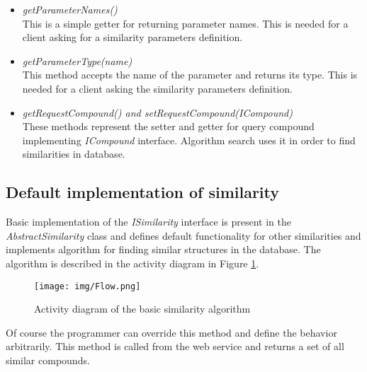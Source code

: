 \documentclass[thesis=M,english]{FITthesis}[2012/10/20]
\begin{document}
\begin{itemize}
\item \textit{getParameterNames()}  \\ This is a simple getter for returning parameter names. This is needed for a client asking for a similarity parameters definition. 

\item \textit{getParameterType(name)}  \\ This method accepts the name of the parameter and returns its type. This is needed for a client asking the similarity parameters definition.

\item \textit{getRequestCompound() and setRequestCompound(ICompound)}  \\ These methods represent the setter and getter for query compound implementing \textit{ICompound} interface. Algorithm search uses it in order to find similarities in database.

\end{itemize}



\subsection{Default implementation of similarity}
\label{abstractSimilarityRef}
Basic implementation of the \textit{ISimilarity} interface is present in the \textit{AbstractSimilarity} class and defines default functionality for other similarities and implements algorithm for finding similar structures in the database. The algorithm is described in the activity diagram in Figure \ref{fig:activityDiagram}.

\begin{figure}
  \centering
  \texttt{[image: img/Flow.png]}
  \caption{Activity diagram of the basic similarity algorithm}
  \label{fig:activityDiagram}
\end{figure}

Of course the programmer can override this method and define the behavior arbitrarily. This method is called from  the web service and returns a set of all similar compounds.
\end{document}
